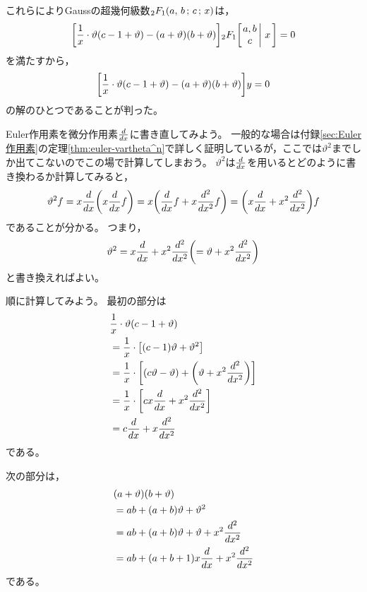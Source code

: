 \documentclass[a4paper,draft]{ltjsarticle}
\begin{document}
これらによりGaussの超幾何級数$\sGauss{a}{b}{c}{x}$は，
\begin{equation}
    \squ{\frac{1}{x}\cdot \vartheta\pare{c-1+\vartheta}-\pare{a+\vartheta}\pare{b+\vartheta}}\Gauss{a}{b}{c}{x}=0
\end{equation}
を満たすから，
\begin{equation}
    \squ{\frac{1}{x}\cdot \vartheta\pare{c-1+\vartheta}-\pare{a+\vartheta}\pare{b+\vartheta}}y=0
\end{equation}
の解のひとつであることが判った。

Euler作用素を微分作用素$\frac{d }{d x}$に書き直してみよう。
一般的な場合は付録\ref{sec:Euler作用素}の定理\ref{thm:euler-vartheta^n}で詳しく証明しているが，ここでは$\vartheta^2$までしか出てこないのでこの場で計算してしまおう。
$\vartheta^2$は$\frac{d }{d x}$を用いるとどのように書き換わるか計算してみると，
\begin{equation}
    \vartheta^2 f=x\diff{}{x}\pare{x\diff{}{x}f}=x\pare{\diff{}{x}f+x\diffn{}{x}{2}f}=\pare{x\diff{}{x}+x^2\diffn{}{x}{2}}f
\end{equation}
であることが分かる。
つまり，
\begin{equation}
    \vartheta^2=x\diff{}{x}+x^2\diffn{}{x}{2}\pare{=\vartheta+x^2\diffn{}{x}{2}}
\end{equation}
と書き換えればよい。

順に計算してみよう。
最初の部分は
\begin{align}
    &\frac{1}{x}\cdot \vartheta\pare{c-1+\vartheta}
    \\
    &=\frac{1}{x}\cdot \squ{\pare{c-1}\vartheta + \vartheta^2}
    \\
    &=\frac{1}{x}\cdot \squ{\pare{c\vartheta - \vartheta}+\pare{\vartheta +x^2\diffn{}{x}{2}}}
    \\
    &=\frac{1}{x}\cdot \squ{cx\diff{}{x} + x^2\diffn{}{x}{2}}
    \\
    &=c\diff{}{x}+x\diffn{}{x}{2}
\end{align}
である。

次の部分は，
\begin{align}
    &\pare{a+\vartheta}\pare{b+\vartheta}
    \\
    &=ab+\pare{a+b}\vartheta +\vartheta^2
    \\
    &=ab+\pare{a+b}\vartheta +\vartheta +x^2\diffn{}{x}{2}
    \\
    &=ab+\pare{a+b+1}x\diff{}{x}+x^2\diffn{}{x}{2}
\end{align}
である。
\end{document}
